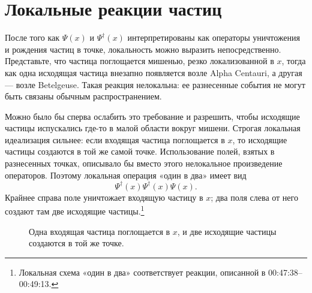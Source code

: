\begin{classroomqa}
\end{classroomqa}

\section{Локальные реакции частиц}

После того как \(\Psi(x)\) и \(\Psi^\dagger(x)\) интерпретированы как операторы уничтожения и рождения частиц в точке, локальность можно выразить непосредственно. Представьте, что частица поглощается мишенью, резко локализованной в \(x\), тогда как одна исходящая частица внезапно появляется возле Alpha Centauri, а другая — возле Betelgeuse. Такая реакция нелокальна: ее разнесенные события не могут быть связаны обычным распространением.

Можно было бы сперва ослабить это требование и разрешить, чтобы исходящие частицы испускались где-то в малой области вокруг мишени. Строгая локальная идеализация сильнее: если входящая частица поглощается в \(x\), то исходящие частицы создаются в той же самой точке. Использование полей, взятых в разнесенных точках, описывало бы вместо этого нелокальное произведение операторов. Поэтому локальная операция «один в два» имеет вид
\begin{equation}
\Psi^\dagger(x)\Psi^\dagger(x)\Psi(x).
\end{equation}
Крайнее справа поле уничтожает входящую частицу в \(x\); два поля слева от него создают там две исходящие частицы.\footnote{Локальная схема «один в два» соответствует реакции, описанной в 00:47:38--00:49:13.}

\begin{figure}[t]
\centering
{}
\caption{Одна входящая частица поглощается в \(x\), и две исходящие частицы создаются в той же точке.}
\end{figure}

